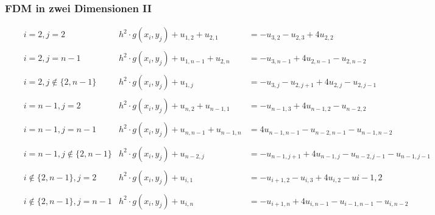 %
%
\begin{frame}\frametitle{FDM in zwei Dimensionen II}
\tiny
\begin{align*}
&i=2, j=2 & h^2\cdot g(x_i,y_j) + u_{1,2}+u_{2,1} &=-u_{3,2}-u_{2,3}+4u_{2,2}\\\quad\\
&i=2, j=n-1 & h^2\cdot g(x_i,y_j) + u_{1,n-1}+u_{2,n} &=-u_{3,n-1}+4u_{2,n-1}-u_{2,n-2}\\\quad\\
&i=2, j\notin \{2,n-1\} & h^2\cdot g(x_i,y_j) + u_{1,j} &=-u_{3,j}-u_{2,j+1}+4u_{2,j}-u_{2,j-1}\\\quad\\
&i=n-1, j=2 & h^2\cdot g(x_i,y_j) + u_{n,2}+u_{n-1,1} &=-u_{n-1,3}+4u_{n-1,2}-u_{n-2,2}\\\quad\\
&i=n-1, j=n-1 & h^2\cdot g(x_i,y_j) + u_{n,n-1}+u_{n-1,n} &=4u_{n-1,n-1}-u_{n-2,n-1}-u_{n-1,n-2}\\\quad\\
&i=n-1, j\notin \{2,n-1\} & h^2\cdot g(x_i,y_j) + u_{n-2,j} &=-u_{n-1,j+1}+4u_{n-1,j}-u_{n-2,j-1}-u_{n-1,j-1}\\\quad\\
&i\notin \{2,n-1\}, j=2 & h^2\cdot g(x_i,y_j) + u_{i,1} &=-u_{i+1,2}-u_{i,3}+4u_{i,2}-u{i-1,2}\\\quad\\
&i\notin \{2,n-1\}, j=n-1 & h^2\cdot g(x_i,y_j) + u_{i,n}&=-u_{i+1,n}+4u_{i,n-1}-u_{i-1,n-1}-u_{i,n-2}
\end{align*}
\end{frame}
%
%

